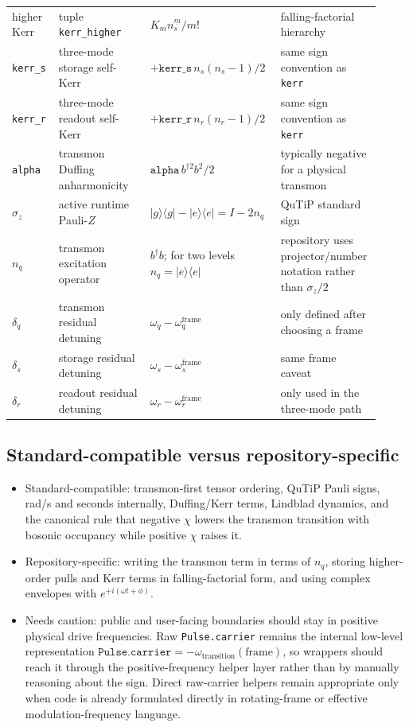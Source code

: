 \documentclass[11pt]{article}
\begin{document}
\begin{longtable}{p{0.12\linewidth} p{0.24\linewidth} p{0.34\linewidth} p{0.22\linewidth}}
higher Kerr & tuple \texttt{kerr\_higher} & \(K_m n_s^{\underline{m}} / m!\) & falling-factorial hierarchy \\
\texttt{kerr\_s} & three-mode storage self-Kerr & \(+\texttt{kerr\_s}\,n_s(n_s-1)/2\) & same sign convention as \texttt{kerr} \\
\texttt{kerr\_r} & three-mode readout self-Kerr & \(+\texttt{kerr\_r}\,n_r(n_r-1)/2\) & same sign convention as \texttt{kerr} \\
\texttt{alpha} & transmon Duffing anharmonicity & \(\texttt{alpha}\,b^{\dagger 2}b^2/2\) & typically negative for a physical transmon \\
\(\sigma_z\) & active runtime Pauli-\(Z\) & \(|g\rangle\langle g|-|e\rangle\langle e|=I-2n_q\) & QuTiP standard sign \\
\(n_q\) & transmon excitation operator & \(b^\dagger b\); for two levels \(n_q=|e\rangle\langle e|\) & repository uses projector/number notation rather than \(\sigma_z/2\) \\
\(\delta_q\) & transmon residual detuning & \(\omega_q-\omega_q^{\mathrm{frame}}\) & only defined after choosing a frame \\
\(\delta_s\) & storage residual detuning & \(\omega_s-\omega_s^{\mathrm{frame}}\) & same frame caveat \\
\(\delta_r\) & readout residual detuning & \(\omega_r-\omega_r^{\mathrm{frame}}\) & only used in the three-mode path \\
\bottomrule
\end{longtable}
\normalsize

\subsection*{Standard-compatible versus repository-specific}
\begin{itemize}[leftmargin=1.5em]
  \item Standard-compatible: transmon-first tensor ordering, QuTiP Pauli signs,
  rad/s and seconds internally, Duffing/Kerr terms, Lindblad dynamics, and the
  canonical rule that negative \(\chi\) lowers the transmon transition with bosonic
  occupancy while positive \(\chi\) raises it.
  \item Repository-specific: writing the transmon term in terms of \(n_q\), storing
  higher-order pulls and Kerr terms in falling-factorial form, and using complex
  envelopes with \(e^{+i(\omega t+\phi)}\).
  \item Needs caution: public and user-facing boundaries should stay in
  positive physical drive frequencies. Raw \texttt{Pulse.carrier} remains the
  internal low-level representation
  \(\texttt{Pulse.carrier}=-\omega_{\mathrm{transition}}(\mathrm{frame})\), so
  wrappers should reach it through the positive-frequency helper layer rather
  than by manually reasoning about the sign. Direct raw-carrier helpers remain
  appropriate only when code is already formulated directly in rotating-frame or
  effective modulation-frequency language.
\end{itemize}
\end{document}
